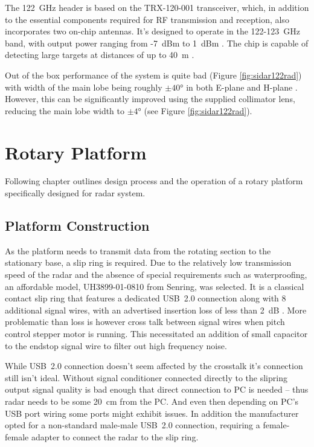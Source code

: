 The 122~GHz header is based on the TRX-120-001 transceiver, which, in addition to the essential components required for RF transmission and reception, also incorporates two on-chip antennas.
It's designed to operate in the 122-123~GHz band, with output power ranging from -7~dBm to 1~dBm \cite{sidarTRX122}.
The chip is capable of detecting large targets at distances of up to 40~m \cite{sidarMANOld}.

Out of the box performance of the system is quite bad (Figure \ref{fig:sidar122rad}) with width of the main lobe being roughly $\pm40\text{°}$ in both E-plane and H-plane \cite{sidarTRX122}.
However, this can be significantly improved using the supplied collimator lens, reducing the main lobe width to $\pm4\text{°}$ \cite{sidarTRX122col} (see Figure \ref{fig:sidar122rad}).





\chapter{Rotary Platform}

Following chapter outlines design process and the operation of a rotary platform specifically designed for \sidar radar system.


\section{Platform Construction}

As the platform needs to transmit data from the rotating section to the stationary base, a slip ring is required.
Due to the relatively low transmission speed of the radar and the absence of special requirements such as waterproofing, an affordable model, UH3899-01-0810 from Senring, was selected.
It is a classical contact slip ring that features a dedicated USB~2.0 connection along with 8 additional signal wires, with an advertised insertion loss of less than 2~dB \cite{slipring}.
More problematic than loss is however cross talk between signal wires when pitch control stepper motor is running.
This necessitated an addition of small capacitor to the endstop signal wire to filter out high frequency noise.

While USB~2.0 connection doesn't seem affected by the crosstalk it's connection still isn't ideal.
Without signal conditioner connected directly to the slipring output signal quality is bad enough that direct connection to PC is needed -- thus radar needs to be some 20~cm from the PC.
And even then depending on PC's USB port wiring some ports might exhibit issues.
In addition the manufacturer opted for a non-standard male-male USB~2.0 connection, requiring a female-female adapter to connect the radar to the slip ring.

